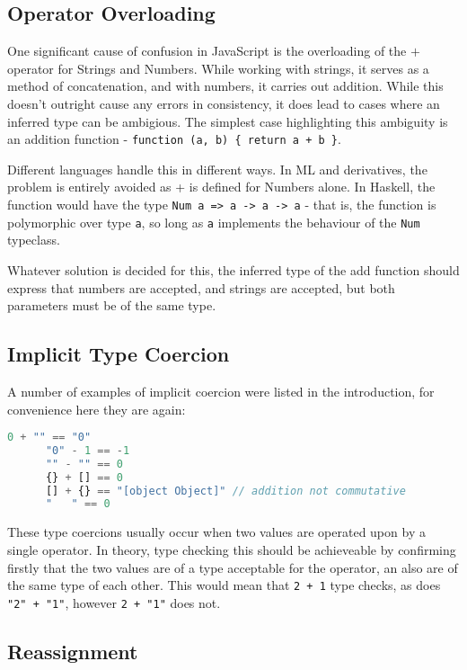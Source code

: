 \documentclass[british, twoside]{bhamthesis}
\theoremstyle{definition}
\begin{document}
  \subsection{Operator Overloading}
    One significant cause of confusion in JavaScript is the overloading of the $+$ operator for Strings and Numbers. While working with strings, it serves as a method of concatenation, and with numbers, it carries out addition. While this doesn't outright cause any errors in consistency, it does lead to cases where an inferred type can be ambigious. The simplest case highlighting this ambiguity is an addition function - \texttt {function (a, b) \{ return a + b \}}.

    Different languages handle this in different ways. In ML and derivatives, the problem is entirely avoided as + is defined for Numbers alone. In Haskell, the function would have the type \texttt {Num a => a -> a -> a} - that is, the function is polymorphic over type \texttt{a}, so long as \texttt{a} implements the behaviour of the \texttt{Num} typeclass.

    Whatever solution is decided for this, the inferred type of the add function should express that numbers are accepted, and strings are accepted, but both parameters must be of the same type.

  \subsection{Implicit Type Coercion}
    A number of examples of implicit coercion were listed in the introduction, for convenience here they are again:

    \begin{lstlisting}[language=JavaScript]
      0 + "" == "0"
      "0" - 1 == -1
      "" - "" == 0
      {} + [] == 0
      [] + {} == "[object Object]" // addition not commutative
      "   " == 0
    \end{lstlisting}

    These type coercions usually occur when two values are operated upon by a single operator. In theory, type checking this should be achieveable by confirming firstly that the two values are of a type acceptable for the operator, an also are of the same type of each other. This would mean that \texttt{2 + 1} type checks, as does \texttt{"2" + "1"}, however \texttt{2 + "1"} does not.

  \subsection{Reassignment}
\end{document}
